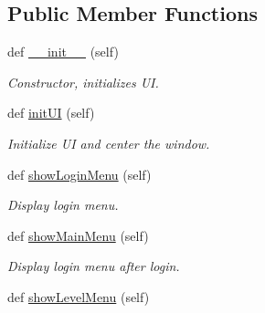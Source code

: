 \subsection*{Public Member Functions}
\begin{DoxyCompactItemize}
\item 
\hypertarget{classsrc_1_1game_1_1_game_a15684812af57df03feb870c9b4b380a2}{}def \hyperlink{classsrc_1_1game_1_1_game_a15684812af57df03feb870c9b4b380a2}{\+\_\+\+\_\+init\+\_\+\+\_\+} (self)\label{classsrc_1_1game_1_1_game_a15684812af57df03feb870c9b4b380a2}

\begin{DoxyCompactList}\small\item\em Constructor, initializes U\+I. \end{DoxyCompactList}\item 
\hypertarget{classsrc_1_1game_1_1_game_a89ba31b71efebcc9b2f43227d833e38f}{}def \hyperlink{classsrc_1_1game_1_1_game_a89ba31b71efebcc9b2f43227d833e38f}{init\+U\+I} (self)\label{classsrc_1_1game_1_1_game_a89ba31b71efebcc9b2f43227d833e38f}

\begin{DoxyCompactList}\small\item\em Initialize U\+I and center the window. \end{DoxyCompactList}\item 
\hypertarget{classsrc_1_1game_1_1_game_a7a14788a82ebc0d4b4b821ac1489a7a0}{}def \hyperlink{classsrc_1_1game_1_1_game_a7a14788a82ebc0d4b4b821ac1489a7a0}{show\+Login\+Menu} (self)\label{classsrc_1_1game_1_1_game_a7a14788a82ebc0d4b4b821ac1489a7a0}

\begin{DoxyCompactList}\small\item\em Display login menu. \end{DoxyCompactList}\item 
\hypertarget{classsrc_1_1game_1_1_game_a218f9c8c6e86a19fa9d3155ce43068a0}{}def \hyperlink{classsrc_1_1game_1_1_game_a218f9c8c6e86a19fa9d3155ce43068a0}{show\+Main\+Menu} (self)\label{classsrc_1_1game_1_1_game_a218f9c8c6e86a19fa9d3155ce43068a0}

\begin{DoxyCompactList}\small\item\em Display login menu after login. \end{DoxyCompactList}\item 
\hypertarget{classsrc_1_1game_1_1_game_afe69a6fa066d92365c226aff1c903e90}{}def \hyperlink{classsrc_1_1game_1_1_game_afe69a6fa066d92365c226aff1c903e90}{show\+Level\+Menu} (self)\label{classsrc_1_1game_1_1_game_afe69a6fa066d92365c226aff1c903e90}


\end{DoxyCompactItemize}
